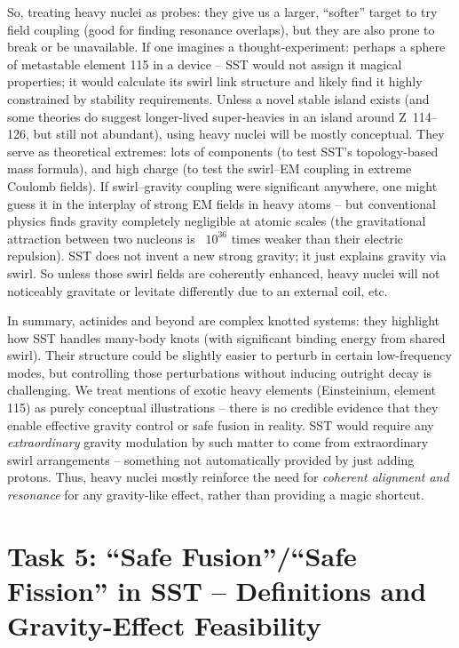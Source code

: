\documentclass[11pt]{article}
\begin{document}
So, treating heavy nuclei as probes: they give us a larger, “softer” target to try field coupling (good for finding resonance overlaps), but they are also prone to break or be unavailable. If one imagines a thought-experiment: perhaps a sphere of metastable element 115 in a device – SST would not assign it magical properties; it would calculate its swirl link structure and likely find it highly constrained by stability requirements. Unless a novel stable island exists (and some theories do suggest longer-lived super-heavies in an island around Z~114–126, but still not abundant), using heavy nuclei will be mostly conceptual. They serve as theoretical extremes: lots of components (to test SST’s topology-based mass formula), and high charge (to test the swirl–EM coupling in extreme Coulomb fields). If swirl–gravity coupling were significant anywhere, one might guess it in the interplay of strong EM fields in heavy atoms – but conventional physics finds gravity completely negligible at atomic scales (the gravitational attraction between two nucleons is ~$10^{36}$ times weaker than their electric repulsion). SST does not invent a new strong gravity; it just explains gravity via swirl. So unless those swirl fields are coherently enhanced, heavy nuclei will not noticeably gravitate or levitate differently due to an external coil, etc.


In summary, actinides and beyond are complex knotted systems: they highlight how SST handles many-body knots (with significant binding energy from shared swirl). Their structure could be slightly easier to perturb in certain low-frequency modes, but controlling those perturbations without inducing outright decay is challenging. We treat mentions of exotic heavy elements (Einsteinium, element 115) as purely conceptual illustrations – there is no credible evidence that they enable effective gravity control or safe fusion in reality. SST would require any \textit{extraordinary} gravity modulation by such matter to come from extraordinary swirl arrangements – something not automatically provided by just adding protons. Thus, heavy nuclei mostly reinforce the need for \textit{coherent alignment and resonance} for any gravity-like effect, rather than providing a magic shortcut.


\section*{Task 5: “Safe Fusion”/“Safe Fission” in SST – Definitions and Gravity-Effect Feasibility}
\end{document}
